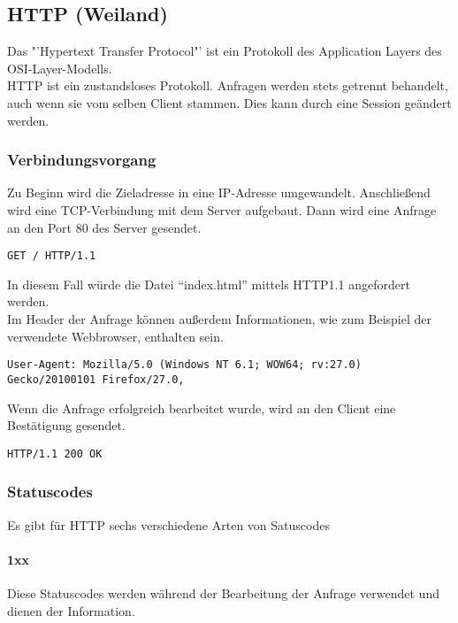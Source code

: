 \subsection{HTTP (Weiland)}

Das "'Hypertext Transfer Protocol"' ist ein Protokoll des Application Layers des OSI-Layer-Modells.
\\
HTTP ist ein zustandsloses Protokoll. Anfragen werden stets getrennt behandelt, auch wenn sie vom selben Client stammen. Dies kann durch eine Session geändert werden.
\subsubsection{Verbindungsvorgang}
Zu Beginn wird die Zieladresse in eine IP-Adresse umgewandelt.
Anschließend wird eine TCP-Verbindung  mit dem Server aufgebaut. 
Dann wird eine Anfrage an den Port 80 des Server gesendet.
\\
\begin{lstlisting}[style=custom, caption={HTTP-Request-Type},label={lst:content_http_request}]
GET / HTTP/1.1
\end{lstlisting}

In diesem Fall würde die Datei \enquote{index.html} mittels HTTP1.1 angefordert werden.
\\
Im Header der Anfrage können außerdem Informationen, wie zum Beispiel der verwendete Webbrowser, enthalten sein.
\\
\begin{lstlisting}[style=custom, caption={HTTP-Request-Header},label={lst:content_http_request_header}]
User-Agent: Mozilla/5.0 (Windows NT 6.1; WOW64; rv:27.0) Gecko/20100101 Firefox/27.0,
\end{lstlisting}
Wenn die Anfrage erfolgreich bearbeitet wurde, wird an den Client eine Bestätigung gesendet.
\\
\begin{lstlisting}[style=custom, caption={HTTP-Response},label={lst:content_http_response}]
HTTP/1.1 200 OK
\end{lstlisting}
\subsubsection{Statuscodes}
Es gibt für HTTP sechs verschiedene Arten von Satuscodes
\paragraph{1xx}
Diese Statuscodes werden während der Bearbeitung der Anfrage verwendet und dienen der Information.
